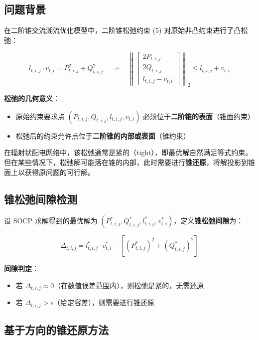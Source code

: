 \documentclass[12pt,a4paper]{article}
\begin{document}
\subsection{问题背景}

在二阶锥交流潮流优化模型中，二阶锥松弛约束 (5) 对原始非凸约束进行了凸松弛：

\begin{equation}
l_{t,i,j} \cdot v_{t,i} = P_{t,i,j}^2 + Q_{t,i,j}^2 \quad \Rightarrow \quad \left\| \begin{bmatrix} 2P_{t,i,j} \\ 2Q_{t,i,j} \\ l_{t,i,j} - v_{t,i} \end{bmatrix} \right\|_2 \leq l_{t,i,j} + v_{t,i}
\end{equation}

\textbf{松弛的几何意义}：
\begin{itemize}
\item 原始约束要求点 $(P_{t,i,j}, Q_{t,i,j}, l_{t,i,j}, v_{t,i})$ 必须位于\textbf{二阶锥的表面}（锥面约束）
\item 松弛后的约束允许点位于\textbf{二阶锥的内部或表面}（锥约束）
\end{itemize}

在辐射状配电网络中，该松弛通常是紧的（tight），即最优解自然满足等式约束。但在某些情况下，松弛解可能落在锥的内部，此时需要进行\textbf{锥还原}，将解投影到锥面上以获得原问题的可行解。

\subsection{锥松弛间隙检测}

设 SOCP 求解得到的最优解为 $(P^*_{t,i,j}, Q^*_{t,i,j}, l^*_{t,i,j}, v^*_{t,i})$，定义\textbf{锥松弛间隙}为：

\begin{equation}
\Delta_{t,i,j} = l^*_{t,i,j} \cdot v^*_{t,i} - \left[(P^*_{t,i,j})^2 + (Q^*_{t,i,j})^2\right]
\end{equation}

\textbf{间隙判定}：
\begin{itemize}
\item 若 $\Delta_{t,i,j} \approx 0$（在数值误差范围内），则松弛是紧的，无需还原
\item 若 $\Delta_{t,i,j} > \epsilon$（给定容差），则需要进行锥还原
\end{itemize}

\subsection{基于方向的锥还原方法}
\end{document}
